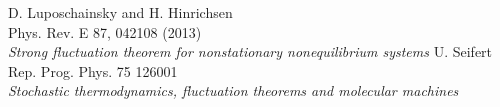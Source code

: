 \begin{thebibliography}{99}
	 {
		D. Luposchainsky and H. Hinrichsen \\
		Phys. Rev. E 87, 042108 (2013) \\
		\emph{Strong fluctuation theorem for nonstationary nonequilibrium systems}
		}
	 {
		U. Seifert \\
		Rep. Prog. Phys. 75 126001 \\
		\emph{Stochastic thermodynamics, fluctuation theorems and molecular machines}
		}
\end{thebibliography}

